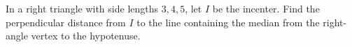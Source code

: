 In a right triangle with side lengths $3,4,5$, let $I$ be the incenter. Find the perpendicular distance from $I$ to the line containing the median from the right-angle vertex to the hypotenuse.
